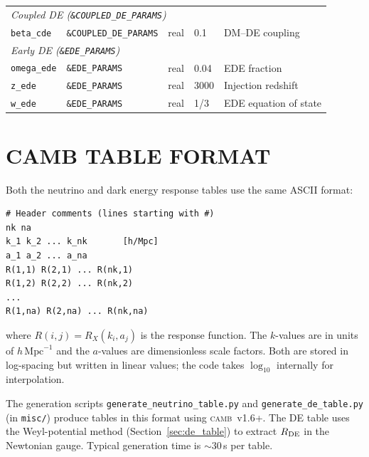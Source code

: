\documentclass[fleqn,usenatbib]{mnras}
\newcommand{\camb}{\textsc{camb}}
\newcommand{\code}[1]{\texttt{#1}}
\newcommand{\Rde}{R_{\rm DE}}
\begin{document}
\begin{table}
\begin{tabular}{lllll}
\midrule
\multicolumn{5}{l}{\emph{Coupled DE (\code{\&COUPLED\_DE\_PARAMS})}} \\
\code{beta\_cde}       & \code{\&COUPLED\_DE\_PARAMS} & real & 0.1 & DM--DE coupling \\
\midrule
\multicolumn{5}{l}{\emph{Early DE (\code{\&EDE\_PARAMS})}} \\
\code{omega\_ede}      & \code{\&EDE\_PARAMS}      & real    & 0.04 & EDE fraction \\
\code{z\_ede}          & \code{\&EDE\_PARAMS}      & real    & 3000 & Injection redshift \\
\code{w\_ede}          & \code{\&EDE\_PARAMS}      & real    & 1/3  & EDE equation of state \\
\bottomrule
\end{tabular}
\end{table}


\section{CAMB TABLE FORMAT}
\label{app:table_format}

Both the neutrino and dark energy response tables use the same ASCII
format:
\begin{verbatim}
# Header comments (lines starting with #)
nk na
k_1 k_2 ... k_nk       [h/Mpc]
a_1 a_2 ... a_na
R(1,1) R(2,1) ... R(nk,1)
R(1,2) R(2,2) ... R(nk,2)
...
R(1,na) R(2,na) ... R(nk,na)
\end{verbatim}
where $R(i,j) = R_X(k_i, a_j)$ is the response function.  The
$k$-values are in units of $h\,\mathrm{Mpc}^{-1}$ and the $a$-values
are dimensionless scale factors.  Both are stored in log-spacing but
written in linear values; the code takes $\log_{10}$ internally for
interpolation.

The generation scripts \code{generate\_neutrino\_table.py} and
\code{generate\_de\_table.py} (in \code{misc/}) produce tables in
this format using \camb\ v1.6+.  The DE table uses the Weyl-potential
method (Section~\ref{sec:de_table}) to extract $\Rde$ in the
Newtonian gauge.  Typical generation time is ${\sim}30$\,s per table.


\label{lastpage}
\end{document}
